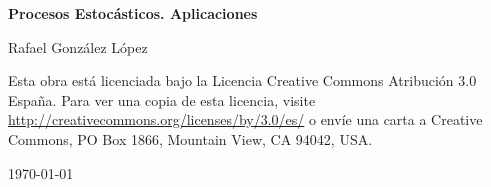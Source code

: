 \documentclass[twoside]{report}
\theoremstyle{definition}
\numberwithin{equation}{section}
\begin{document}
\begin{titlepage}
	\centering
	{\huge\bfseries Procesos Estocásticos. Aplicaciones\par}
	\vspace{2cm}
	{\Large Rafael González López\par}
	\vfill
	Esta obra está licenciada bajo la Licencia Creative Commons Atribución 3.0 España. Para ver una copia de esta licencia, visite \url{http://creativecommons.org/licenses/by/3.0/es/} o envíe una carta a Creative Commons, PO Box 1866, Mountain View, CA 94042, USA.

	{\large \today\par}
\end{titlepage}
\tableofcontents
\addtocounter{chapter}{-1}




\end{document}
